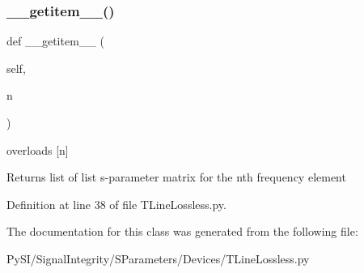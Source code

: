\subsubsection{\texorpdfstring{\+\_\+\+\_\+getitem\+\_\+\+\_\+()}{\_\_getitem\_\_()}}
{\footnotesize\ttfamily def \+\_\+\+\_\+getitem\+\_\+\+\_\+ (\begin{DoxyParamCaption}\item[{}]{self,  }\item[{}]{n }\end{DoxyParamCaption})}



overloads \mbox{[}n\mbox{]} 

\begin{DoxyReturn}{Returns}
list of list s-\/parameter matrix for the nth frequency element 
\end{DoxyReturn}


Definition at line 38 of file T\+Line\+Lossless.\+py.



The documentation for this class was generated from the following file\+:\begin{DoxyCompactItemize}
\item 
Py\+S\+I/\+Signal\+Integrity/\+S\+Parameters/\+Devices/T\+Line\+Lossless.\+py\end{DoxyCompactItemize}
